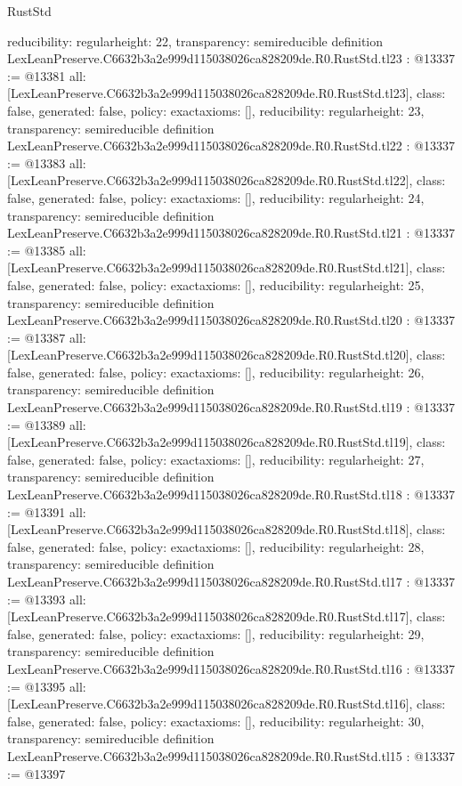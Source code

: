\begin{lexlean}{RustStd}
\begin{coremodule}
{  reducibility: regular{height: 22},
  transparency: semireducible
}
definition LexLeanPreserve.C6632b3a2e999d115038026ca828209de.R0.RustStd.tl23 : @13337 := @13381 {
  all: [LexLeanPreserve.C6632b3a2e999d115038026ca828209de.R0.RustStd.tl23],
  class: false,
  generated: false,
  policy: exact{axioms: []},
  reducibility: regular{height: 23},
  transparency: semireducible
}
definition LexLeanPreserve.C6632b3a2e999d115038026ca828209de.R0.RustStd.tl22 : @13337 := @13383 {
  all: [LexLeanPreserve.C6632b3a2e999d115038026ca828209de.R0.RustStd.tl22],
  class: false,
  generated: false,
  policy: exact{axioms: []},
  reducibility: regular{height: 24},
  transparency: semireducible
}
definition LexLeanPreserve.C6632b3a2e999d115038026ca828209de.R0.RustStd.tl21 : @13337 := @13385 {
  all: [LexLeanPreserve.C6632b3a2e999d115038026ca828209de.R0.RustStd.tl21],
  class: false,
  generated: false,
  policy: exact{axioms: []},
  reducibility: regular{height: 25},
  transparency: semireducible
}
definition LexLeanPreserve.C6632b3a2e999d115038026ca828209de.R0.RustStd.tl20 : @13337 := @13387 {
  all: [LexLeanPreserve.C6632b3a2e999d115038026ca828209de.R0.RustStd.tl20],
  class: false,
  generated: false,
  policy: exact{axioms: []},
  reducibility: regular{height: 26},
  transparency: semireducible
}
definition LexLeanPreserve.C6632b3a2e999d115038026ca828209de.R0.RustStd.tl19 : @13337 := @13389 {
  all: [LexLeanPreserve.C6632b3a2e999d115038026ca828209de.R0.RustStd.tl19],
  class: false,
  generated: false,
  policy: exact{axioms: []},
  reducibility: regular{height: 27},
  transparency: semireducible
}
definition LexLeanPreserve.C6632b3a2e999d115038026ca828209de.R0.RustStd.tl18 : @13337 := @13391 {
  all: [LexLeanPreserve.C6632b3a2e999d115038026ca828209de.R0.RustStd.tl18],
  class: false,
  generated: false,
  policy: exact{axioms: []},
  reducibility: regular{height: 28},
  transparency: semireducible
}
definition LexLeanPreserve.C6632b3a2e999d115038026ca828209de.R0.RustStd.tl17 : @13337 := @13393 {
  all: [LexLeanPreserve.C6632b3a2e999d115038026ca828209de.R0.RustStd.tl17],
  class: false,
  generated: false,
  policy: exact{axioms: []},
  reducibility: regular{height: 29},
  transparency: semireducible
}
definition LexLeanPreserve.C6632b3a2e999d115038026ca828209de.R0.RustStd.tl16 : @13337 := @13395 {
  all: [LexLeanPreserve.C6632b3a2e999d115038026ca828209de.R0.RustStd.tl16],
  class: false,
  generated: false,
  policy: exact{axioms: []},
  reducibility: regular{height: 30},
  transparency: semireducible
}
definition LexLeanPreserve.C6632b3a2e999d115038026ca828209de.R0.RustStd.tl15 : @13337 := @13397 {
}
\end{coremodule}
\end{lexlean}
